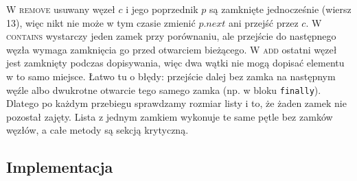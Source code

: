 \documentclass[11pt,a4paper]{article}
\begin{document}
W \textsc{remove} usuwany węzeł $c$ i jego poprzednik $p$ są zamknięte jednocześnie (wiersz 13), więc
nikt nie może w tym czasie zmienić $p.\textit{next}$ ani przejść przez $c$. W \textsc{contains}
wystarczy jeden zamek przy porównaniu, ale przejście do następnego węzła wymaga zamknięcia go przed
otwarciem bieżącego. W \textsc{add} ostatni węzeł jest zamknięty podczas dopisywania, więc dwa wątki
nie mogą dopisać elementu w to samo miejsce. Łatwo tu o błędy: przejście dalej bez zamka na następnym
węźle albo dwukrotne otwarcie tego samego zamka (np. w bloku \texttt{finally}). Dlatego po każdym
przebiegu sprawdzamy rozmiar listy i to, że żaden zamek nie pozostał zajęty.
Lista z jednym zamkiem wykonuje te same pętle bez zamków węzłów, a całe metody są sekcją krytyczną.

\subsection{Implementacja}
\end{document}
